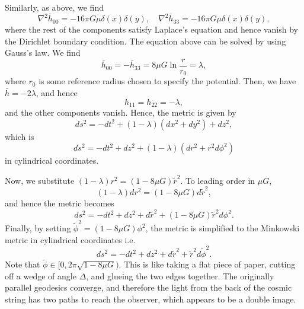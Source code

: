\begin{solution}
    Similarly, as above, we find
    \begin{equation}
        \nabla^2\bar h_{00} = -16\pi G\mu\delta(x)\delta(y), \quad \nabla^2 \bar h_{33} = -16\pi G\mu\delta(x)\delta(y),
    \end{equation}
    where the rest of the components satisfy Laplace's equation and hence vanish by the Dirichlet boundary condition. The equation above can be solved by using Gauss's law. We find
    \begin{equation}
        \bar h_{00} = - \bar h_{33} =  8\mu G\ln \frac{r}{r_0} = \lambda,
    \end{equation}
    where $r_0$ is some reference radius chosen to specify the potential. Then, we have $\bar h = -2\lambda$, and hence
    \begin{equation}
        h_{11} = h_{22} = - \lambda,
    \end{equation}
    and the other components vanish. Hence, the metric is given by
    \begin{equation}
        ds^2 = -dt^2 + (1-\lambda)(dx^2 + dy^2) + dz^2,
    \end{equation}
    which is
    \begin{equation}
        ds^2 = -dt^2 +dz^2 +(1-\lambda)(dr^2 + r^2 d\phi^2)
    \end{equation}
    in cylindrical coordinates.

    Now, we substitute $(1-\lambda)r^2 = (1 - 8\mu G)\tilde{r}^2$. To leading order in $\mu G$, 
    \begin{equation}
        (1-\lambda)dr^2 = (1-8\mu G) d\tilde{r}^2,
    \end{equation}
    and hence the metric becomes
    \begin{equation}
        ds^2 = -dt^2 + dz^2 + d\tilde{r}^2 + (1-8\mu G)\tilde{r}^2d\phi^2.
    \end{equation}
    Finally, by setting $\tilde{\phi}^2 = (1-8\mu G) \phi^2$, the metric is simplified to the Minkowski metric in cylindrical coordinates i.e.
    \begin{equation}
        ds^2 = -dt^2 + dz^2 + d\tilde{r}^2 +\tilde{r}^2d\tilde{\phi}^2.
    \end{equation}
    Note that $\tilde{\phi} \in [0,2\pi\sqrt{1-8\mu G})$. This is like taking a flat piece of paper, cutting off a wedge of angle $\Delta$, and glueing the two edges together. The originally parallel geodesics converge, and therefore the light from the back of the cosmic string has two paths to reach the observer, which appears to be a double image.

    
\end{solution}
